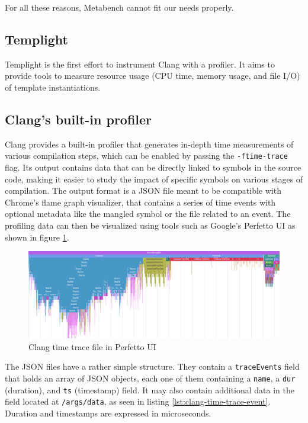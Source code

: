 \documentclass[../main]{subfiles}
\begin{document}
For all these reasons, Metabench cannot fit our needs properly.

\subsection{
  Templight
}

Templight \cite{templight} is the first effort to instrument Clang with a
profiler. It aims to provide tools to measure resource usage (CPU time,
memory usage, and file I/O) of template instantiations.


\subsection{
  Clang's built-in profiler
}

Clang provides a built-in profiler \cite{time-trace} that generates
in-depth time measurements of various compilation steps, which can be enabled by
passing the \lstinline{-ftime-trace} flag. Its output contains data that can be
directly linked to symbols in the source code, making it easier to study the
impact of specific symbols on various stages of compilation. The output format
is a JSON file meant to be compatible with Chrome's flame graph visualizer, that
contains a series of time events with optional metadata like the mangled \cpp
symbol or the file related to an event. The profiling data can then be
visualized using tools such as Google's Perfetto UI as shown in figure
\ref{fig:perfetto-time-trace-ui}.

\begin{figure}[t]
\includegraphics[scale=0.425, angle=90]{images/perfetto-ui.png}
\caption{Clang time trace file in Perfetto UI}
\label{fig:perfetto-time-trace-ui}
\clearpage
\end{figure}

The JSON files have a rather simple structure. They contain a
\lstinline{traceEvents} field that holds an array of JSON objects, each one of
them containing a \lstinline{name}, a \lstinline{dur} (duration), and
\lstinline{ts} (timestamp) field. It may also contain additional data in the
field located at \lstinline{/args/data}, as seen in listing
\ref{lst:clang-time-trace-event}. Duration and timestamps are expressed in
microseconds.
\end{document}
